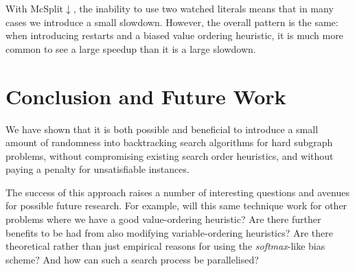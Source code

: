 \documentclass[a4paper,UKenglish]{lipics-v2018}
\begin{document}
With McSplit${\downarrow}$, the inability to use two watched literals means that in many cases we
introduce a small slowdown. However, the overall pattern is the same: when introducing restarts and
a biased value ordering heuristic, it is much more common to see a large speedup than it is a large
slowdown.

\section{Conclusion and Future Work}

We have shown that it is both possible and beneficial to introduce a small amount of randomness into
backtracking search algorithms for hard subgraph problems, without compromising existing search
order heuristics, and without paying a penalty for unsatisfiable instances.

The success of this approach raises a number of interesting questions and avenues for possible
future research. For example, will this same technique work for other problems where we have a good
value-ordering heuristic? Are there further benefits to be had from also modifying variable-ordering
heuristics? Are there theoretical rather than just empirical reasons for using the
\emph{softmax}-like bias scheme? And how can such a search process be parallelised?


\end{document}
